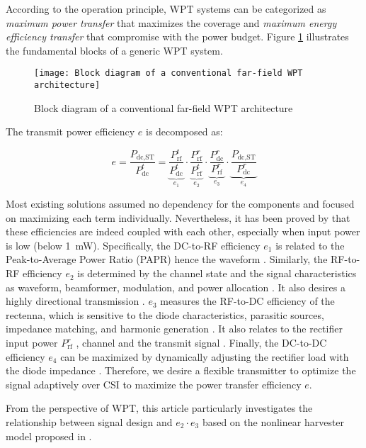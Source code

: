 According to the operation principle, WPT systems can be categorized as \textit{maximum power transfer} that maximizes the coverage and \textit{maximum energy efficiency transfer} \cite{Hui2014} that compromise with the power budget. Figure \ref{fig:wpt-block-diagram} illustrates the fundamental blocks of a generic WPT system.

\begin{figure}
  \centering
    \texttt{[image: Block diagram of a conventional far-field WPT architecture]}
  \caption{Block diagram of a conventional far-field WPT architecture \cite{Clerckx2018a}}
  \label{fig:wpt-block-diagram}
\end{figure}

The transmit power efficiency $e$ is decomposed as:

\begin{equation}\label{eqn:power_utilization_efficiency}
  e = \frac{{{P_{{\text{dc}},{\text{ST}}}}}}{{P_{{\text{dc}}}^t}} = \underbrace {\frac{{P_{{\text{rf}}}^t}}{{P_{{\text{dc}}}^t}}}_{{e_1}} \cdot \underbrace {\frac{{P_{{\text{rf}}}^r}}{{P_{{\text{rf}}}^t}}}_{{e_2}} \cdot \underbrace {\frac{{P_{{\text{dc}}}^r}}{{P_{{\text{rf}}}^r}}}_{{e_3}} \cdot \underbrace {\frac{{{P_{{\text{dc}},{\text{ST}}}}}}{{P_{{\text{dc}}}^r}}}_{{e_4}}
\end{equation}

Most existing solutions assumed no dependency for the components and focused on maximizing each term individually. Nevertheless, it has been proved by \cite{Boshkovska2015, Clerckx2016, Zeng2017} that these efficiencies are indeed coupled with each other, especially when input power is low (below 1~mW). Specifically, the DC-to-RF efficiency ${e_1}$ is related to the Peak-to-Average Power Ratio (PAPR) hence the waveform \cite{Boaventura2011}. Similarly, the RF-to-RF efficiency ${e_2}$ is determined by the channel state and the signal characteristics as waveform, beamformer, modulation, and power allocation \cite{Clerckx2019}. It also desires a highly directional transmission \cite{Takahashi2011}. ${e_3}$ measures the RF-to-DC efficiency of the rectenna, which is sensitive to the diode characteristics, parasitic sources, impedance matching, and harmonic generation \cite{Strassner2013, Valenta2014}. It also relates to the rectifier input power ${P_{{\text{rf}}}^r}$ \cite{Trotter2009, Chen2017, Clerckx2018a}, channel and the transmit signal \cite{Collado2014, Boaventura2015, Clerckx2019}. Finally, the DC-to-DC efficiency ${e_4}$ can be maximized by dynamically adjusting the rectifier load with the diode impedance \cite{Dolgov2010}. Therefore, we desire a flexible transmitter to optimize the signal adaptively over CSI to maximize the power transfer efficiency $e$.

From the perspective of WPT, this article particularly investigates the relationship between signal design and ${e_2} \cdot {e_3}$ based on the nonlinear harvester model proposed in \cite{Clerckx2016}.
